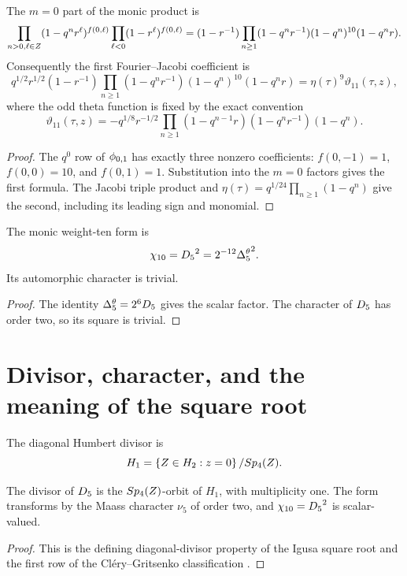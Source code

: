 \begin{proposition}
The $m=0$ part of the monic product is
\[
 \prod_{n>0,\ell\in Z}(1-q^nr^\ell)^{f(0,\ell)}
 \prod_{\ell<0}(1-r^\ell)^{f(0,\ell)}
 =(1-r^{-1})\prod_{n\ge1}
 (1-q^nr^{-1})(1-q^n)^{10}(1-q^nr).
\]
Consequently the first Fourier--Jacobi coefficient is
\[
 q^{1/2}r^{1/2}(1-r^{-1})
 \prod_{n\ge1}(1-q^nr^{-1})(1-q^n)^{10}(1-q^nr)
 =\eta(\tau)^9\vartheta_{11}(\tau,z),
\]
where the odd theta function is fixed by the exact convention
\[
 \vartheta_{11}(\tau,z)
 =-q^{1/8}r^{-1/2}
 \prod_{n\ge1}(1-q^{n-1}r)(1-q^nr^{-1})(1-q^n).
\]
\end{proposition}
\begin{proof}
The $q^0$ row of ${\phi_{0,1}}$ has exactly three nonzero coefficients:
$f(0,-1)=1$, $f(0,0)=10$, and $f(0,1)=1$. Substitution into the $m=0$ factors gives the first formula. The Jacobi triple product and $\eta(\tau)=q^{1/24}\prod_{n\ge1}(1-q^n)$ give the second, including its leading sign and monomial.
\end{proof}

\begin{corollary}
The monic weight-ten form is
\[
 {\chi_{10}}={D_5}^2=2^{-12}{\Delta^{\theta}_5}^2.
\]
Its automorphic character is trivial.
\end{corollary}
\begin{proof}
The identity ${\Delta^{\theta}_5}=2^6{D_5}$ gives the scalar factor.  The character of ${D_5}$ has order two, so its square is trivial.
\end{proof}

\chapter{Divisor, character, and the meaning of the square root}
The diagonal Humbert divisor is
\[
 H_1=\left\{Z\in H_2:z=0\right\}/Sp_4(Z).
\]

\begin{theorem}
The divisor of ${D_5}$ is the $Sp_4(Z)$-orbit of $H_1$, with multiplicity one. The form transforms by the Maass character $\nu_5$ of order two, and ${\chi_{10}}={D_5}^2$ is scalar-valued.
\end{theorem}
\begin{proof}
This is the defining diagonal-divisor property of the Igusa square root and the first row of the Cl\'ery--Gritsenko classification \cite{Igusa62,Igusa64,GC}.
\end{proof}

